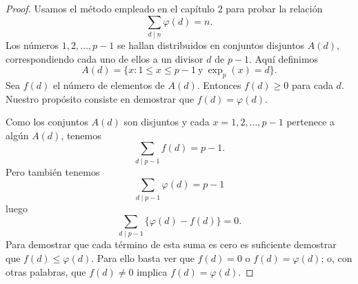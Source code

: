 \documentclass[12pt,a4paper]{book}
\begin{document}
    \begin{proof}
        Usamos el método empleado en el capítulo 2 para probar la relación
        \begin{equation*}
            \sum_{d\mid n}\varphi(d)=n.
        \end{equation*}
        Los números $1,2,\dots,p-1$ se hallan distribuidos en conjuntos disjuntos $A(d)$,
        correspondiendo cada uno de ellos a un divisor $d$ de $p-1$. Aquí definimos
        \begin{equation*}
            A(d)=\{x:1\leq x\leq p-1\ \text{y}\ \exp_{p}(x)=d\}.
        \end{equation*}
        Sea $f(d)$ el número de elementos de $A(d)$. Entonces $f(d)\geq0$ para cada $d$.
        Nuestro propósito consiste en demostrar que $f(d)=\varphi(d)$.

        Como los conjuntos $A(d)$ son disjuntos y cada $x=1,2,\dots,p-1$ pertenece a algún
        $A(d)$, tenemos
        \begin{equation*}
            \sum_{d\mid p-1}f(d)=p-1.
        \end{equation*}
        Pero también tenemos
        \begin{equation*}
            \sum_{d\mid p-1}\varphi(d)=p-1
        \end{equation*}
        luego
        \begin{equation*}
            \sum_{d\mid p-1}\{\varphi(d)-f(d)\}=0.
        \end{equation*}
        Para demostrar que cada término de esta suma es cero es suficiente demostrar que
        $f(d)\leq\varphi(d)$. Para ello basta ver que $f(d)=0$ o $f(d)=\varphi(d)$; o, con
        otras palabras, que $f(d)\neq0$ implica $f(d)=\varphi(d)$.


\end{proof}
\end{document}
